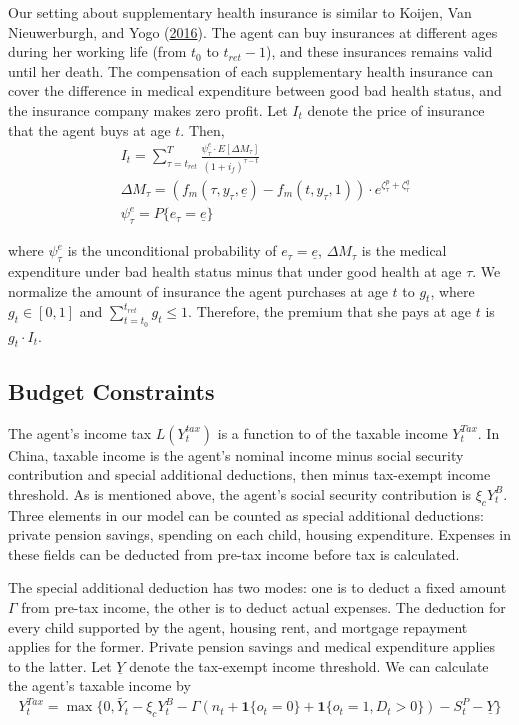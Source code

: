 \documentclass[
  12pt,
]{article}
\begin{document}
Our setting about supplementary health insurance is similar to Koijen,
Van Nieuwerburgh, and Yogo
(\protect\hyperlink{ref-koijen_health_2016}{2016}). The agent can buy
insurances at different ages during her working life (from \(t_0\) to
\(t_{ret}-1\)), and these insurances remains valid until her death. The
compensation of each supplementary health insurance can cover the
difference in medical expenditure between good bad health status, and
the insurance company makes zero profit. Let \(I_t\) denote the price of
insurance that the agent buys at age \(t\). Then, \begin{equation}
\begin{aligned}
& I_t=\sum_{\tau=t_{ret}}^T \frac{\psi^e_\tau\cdot E[\Delta M_\tau]}{(1+i_f)^{\tau-t}} \\
& \Delta M_\tau = (f_m(\tau,y_\tau,\underline{e}) - f_m(t,y_\tau,1)) \cdot e^{\zeta^p_\tau + \zeta^q_\tau}\\
& \psi^e_\tau = P\{e_\tau = \underline{e}\}
\end{aligned}
\end{equation}

where \(\psi^e_\tau\) is the unconditional probability of
\(e_\tau=\underline{e}\), \(\Delta M_\tau\) is the medical expenditure
under bad health status minus that under good health at age \(\tau\). We
normalize the amount of insurance the agent purchases at age \(t\) to
\(g_t\), where \(g_t \in [0,1]\) and
\(\sum_{t=t_0}^{t_{ret}}{g_t}\leq 1\). Therefore, the premium that she
pays at age \(t\) is \(g_t \cdot I_t\).

\hypertarget{budget-constraints}{%
\subsection{Budget Constraints}\label{budget-constraints}}

The agent's income tax \(L(Y^{tax}_t)\) is a function to of the taxable
income \(Y^{Tax}_t\). In China, taxable income is the agent's nominal
income minus social security contribution and special additional
deductions, then minus tax-exempt income threshold. As is mentioned
above, the agent's social security contribution is \(\xi_cY^B_t\). Three
elements in our model can be counted as special additional deductions:
private pension savings, spending on each child, housing expenditure.
Expenses in these fields can be deducted from pre-tax income before tax
is calculated.

The special additional deduction has two modes: one is to deduct a fixed
amount \(\Gamma\) from pre-tax income, the other is to deduct actual
expenses. The deduction for every child supported by the agent, housing
rent, and mortgage repayment applies for the former. Private pension
savings and medical expenditure applies to the latter. Let
\(\underline{Y}\) denote the tax-exempt income threshold. We can
calculate the agent's taxable income by \begin{equation}
Y^{Tax}_t = \max\{0,\tilde{Y_t} - \xi_cY^B_t  - \Gamma(n_t+\textbf{1}\{o_t=0\}+\textbf{1}\{o_t=1,D_t>0\}) - S^P_t -\underline{Y}\}
\end{equation}
\end{document}
